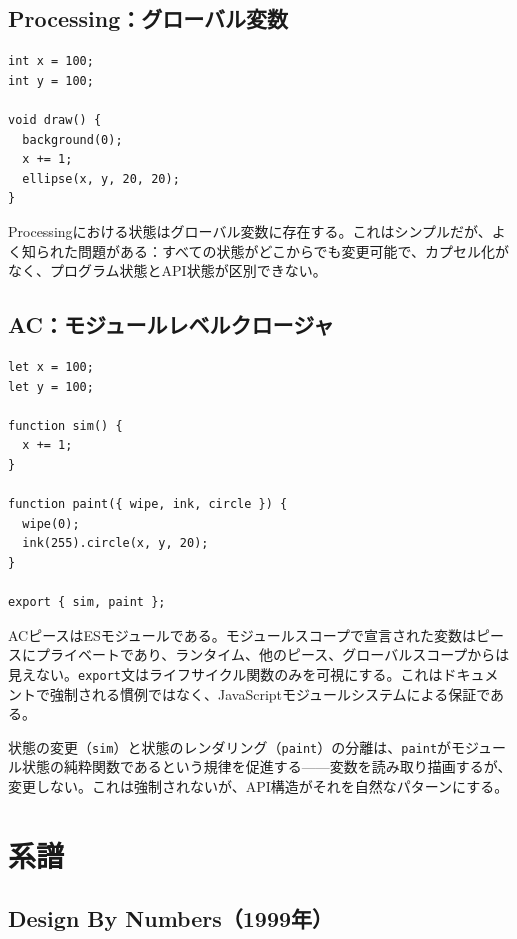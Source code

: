 \documentclass[10pt,letterpaper,twocolumn]{article}
\begin{document}
\subsection{Processing：グローバル変数}

\begin{lstlisting}[style=processingstyle]
int x = 100;
int y = 100;

void draw() {
  background(0);
  x += 1;
  ellipse(x, y, 20, 20);
}
\end{lstlisting}

Processingにおける状態はグローバル変数に存在する。これはシンプルだが、よく知られた問題がある：すべての状態がどこからでも変更可能で、カプセル化がなく、プログラム状態とAPI状態が区別できない。

\subsection{AC：モジュールレベルクロージャ}

\begin{lstlisting}[style=acjsstyle]
let x = 100;
let y = 100;

function sim() {
  x += 1;
}

function paint({ wipe, ink, circle }) {
  wipe(0);
  ink(255).circle(x, y, 20);
}

export { sim, paint };
\end{lstlisting}

ACピースはESモジュールである。モジュールスコープで宣言された変数はピースにプライベートであり、ランタイム、他のピース、グローバルスコープからは見えない。\texttt{export}文はライフサイクル関数のみを可視にする。これはドキュメントで強制される慣例ではなく、JavaScriptモジュールシステムによる保証である。

状態の変更（\texttt{sim}）と状態のレンダリング（\texttt{paint}）の分離は、\texttt{paint}がモジュール状態の純粋関数であるという規律を促進する——変数を読み取り描画するが、変更しない。これは強制されないが、API構造がそれを自然なパターンにする。


\section{系譜}
\label{sec:genealogy}

\subsection{Design By Numbers（1999年）}
\end{document}
